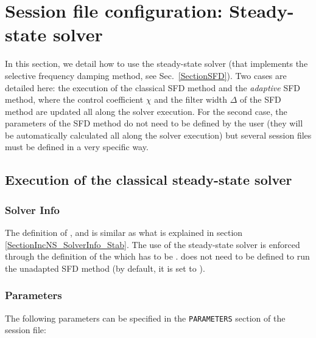 \section{Session file configuration: Steady-state solver}
\label{SectionSFD_XML}

In this section, we detail how to use the steady-state solver (that
implements the selective frequency damping method, see
Sec.~\ref{SectionSFD}).  Two cases are detailed here: the execution of
the classical SFD method and the \textit{adaptive} SFD method, where
the control coefficient $\chi$ and the filter width $\Delta$ of the
SFD method are updated all along the solver execution. For the second
case, the parameters of the SFD method do not need to be defined by
the user (they will be automatically calculated all along the solver
execution) but several session files must be defined in a very
specific way.

\subsection{Execution of the classical steady-state solver}

\subsubsection{Solver Info}

The definition of ,  and
 is similar as what is explained in section~
\ref{SectionIncNS_SolverInfo_Stab}. The use of the steady-state solver
is enforced through the definition of the  which has to be
.  does not need to be
defined to run the unadapted SFD method (by default, it is set to
).

\subsubsection{Parameters}

The following parameters can be specified in the \texttt{PARAMETERS} section of the session file:

